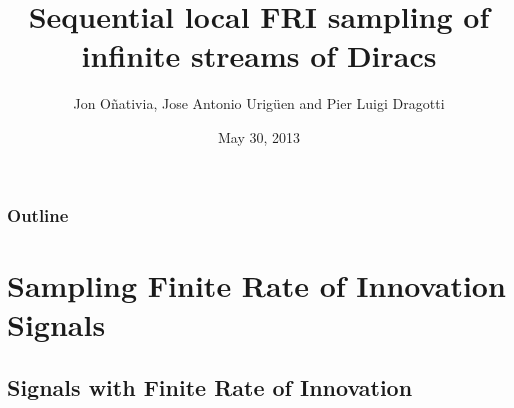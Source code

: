 \documentclass[8pt]{beamer}
\begin{document}
\title[CSP group - Imperial College London \hspace{2.4cm}
\insertframenumber/\inserttotalframenumber]
{Sequential local FRI sampling of infinite streams of Diracs}
\author{Jon O\~{n}ativia, Jose Antonio Urig\"{u}en and Pier Luigi Dragotti}
\date{May 30, 2013}      %


\begin{frame}
\titlepage
\end{frame}



\section*{}
\begin{frame}
\frametitle{Outline}
\Large{\tableofcontents}
\end{frame}




\section[Sampling FRI signals]{Sampling Finite Rate of Innovation Signals}

\subsection{Signals with Finite Rate of Innovation}
\end{document}
